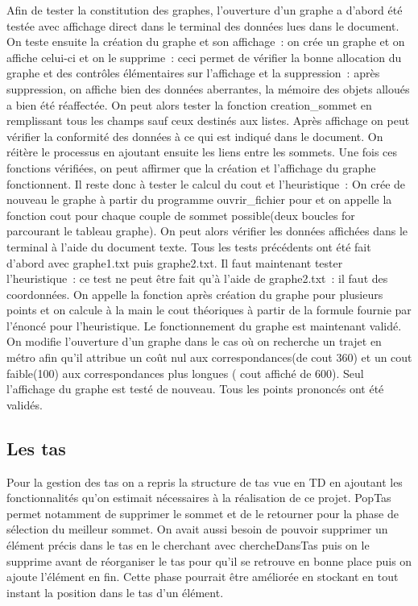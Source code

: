 \documentclass[12pt,a4paper]{article}
\begin{document}
Afin de tester la constitution des graphes, l’ouverture d’un graphe a d’abord été testée avec affichage direct dans le terminal des données lues dans le document.
On teste ensuite la création du graphe et son affichage : on crée un graphe et on affiche celui-ci et on le supprime : ceci permet de vérifier la bonne allocation du graphe et des contrôles élémentaires sur l’affichage et la suppression : après suppression, on affiche bien des données aberrantes, la mémoire des objets alloués a bien été réaffectée.
On peut alors tester la fonction creation\_sommet en remplissant tous les champs sauf ceux destinés aux listes. Après affichage on peut vérifier la conformité des données à ce qui est indiqué dans le document.
On réitère le processus en ajoutant ensuite les liens entre les sommets. Une fois ces fonctions vérifiées, on peut affirmer que la création et l’affichage du graphe fonctionnent. Il reste donc à tester le calcul du cout et l’heuristique :
On crée de nouveau le graphe à partir du programme ouvrir\_fichier pour et on appelle la fonction cout pour chaque couple de sommet possible(deux boucles for parcourant le tableau graphe). On peut alors vérifier les données affichées dans le terminal à l’aide du document texte. Tous les tests précédents ont été fait d’abord avec graphe1.txt puis graphe2.txt.
Il faut maintenant tester l’heuristique : ce test ne peut être fait qu’à l’aide de graphe2.txt : il faut des coordonnées. On appelle la fonction après création du graphe pour plusieurs points et on calcule à la main le cout théoriques à partir de la formule fournie par l’énoncé pour l’heuristique. 
Le fonctionnement du graphe est maintenant validé.
On modifie l’ouverture d’un graphe dans le cas où on recherche un trajet en métro afin qu’il attribue un coût nul aux correspondances(de cout 360) et un cout faible(100) aux correspondances plus longues ( cout affiché de 600). Seul l’affichage du graphe est testé de nouveau. Tous les points prononcés ont été validés.


\subsection{Les tas}
       Pour la gestion des tas on a repris la structure de tas vue en TD en ajoutant les fonctionnalités qu'on estimait nécessaires à la réalisation de ce projet.
PopTas permet notamment de supprimer le sommet et de le retourner pour la phase de sélection du meilleur sommet. On avait aussi besoin de pouvoir supprimer un élément précis dans le tas en le cherchant avec chercheDansTas puis on le supprime avant de réorganiser le tas pour qu'il se retrouve en bonne place puis on ajoute l'élément en fin. Cette phase pourrait être améliorée en stockant en tout instant la position dans le tas d'un élément.
\end{document}
